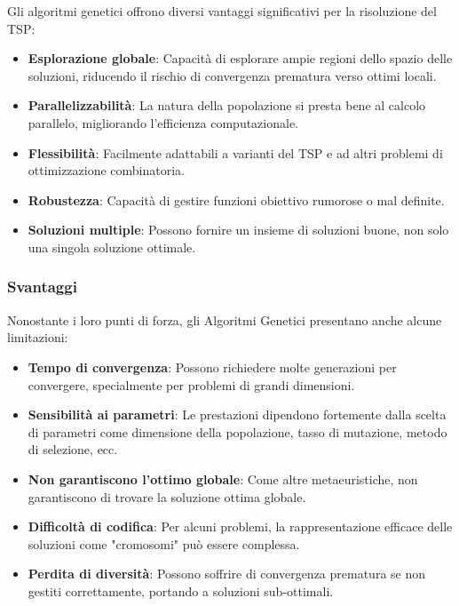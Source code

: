 Gli algoritmi genetici offrono diversi vantaggi significativi per la risoluzione del \gls{TSP}:

\begin{itemize}
	\item \textbf{Esplorazione globale}: Capacità di esplorare ampie regioni dello spazio delle soluzioni, riducendo il rischio di convergenza prematura verso ottimi locali.
	\item \textbf{Parallelizzabilità}: La natura della popolazione si presta bene al calcolo parallelo, migliorando l'efficienza computazionale.
	\item \textbf{Flessibilità}: Facilmente adattabili a varianti del \gls{TSP} e ad altri problemi di ottimizzazione combinatoria.
	\item \textbf{Robustezza}: Capacità di gestire funzioni obiettivo rumorose o mal definite.
	\item \textbf{Soluzioni multiple}: Possono fornire un insieme di soluzioni buone, non solo una singola soluzione ottimale.
\end{itemize}

\subsubsection{Svantaggi}

Nonostante i loro punti di forza, gli Algoritmi Genetici presentano anche alcune limitazioni:

\begin{itemize}
	\item \textbf{Tempo di convergenza}: Possono richiedere molte generazioni per convergere, specialmente per problemi di grandi dimensioni.
	\item \textbf{Sensibilità ai parametri}: Le prestazioni dipendono fortemente dalla scelta di parametri come dimensione della popolazione, tasso di mutazione, metodo di selezione, ecc.
	\item \textbf{Non garantiscono l'ottimo globale}: Come altre metaeuristiche, non garantiscono di trovare la soluzione ottima globale.
	\item \textbf{Difficoltà di codifica}: Per alcuni problemi, la rappresentazione efficace delle soluzioni come "cromosomi" può essere complessa.
	\item \textbf{Perdita di diversità}: Possono soffrire di convergenza prematura se non gestiti correttamente, portando a soluzioni sub-ottimali.
\end{itemize}


